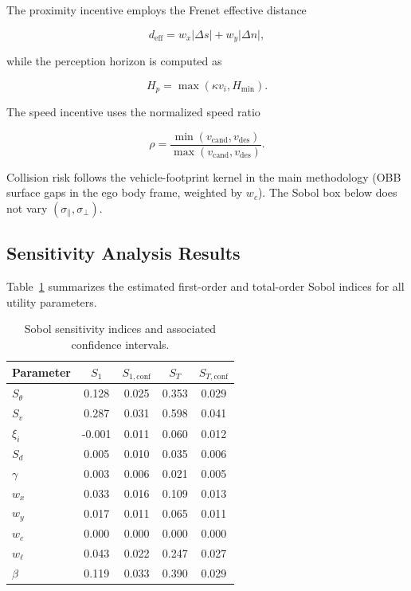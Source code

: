 \documentclass[conference]{IEEEtran}
\begin{document}
The proximity incentive employs the Frenet effective distance

\begin{equation}
d_{\mathrm{eff}}
=
w_x|\Delta s|
+
w_y|\Delta n|,
\end{equation}

while the perception horizon is computed as

\begin{equation}
H_p
=
\max(\kappa v_i,H_{\min}).
\end{equation}

The speed incentive uses the normalized speed ratio

\begin{equation}
\rho
=
\frac{\min(v_{\mathrm{cand}},v_{\mathrm{des}})}
{\max(v_{\mathrm{cand}},v_{\mathrm{des}})}.
\end{equation}

Collision risk follows the vehicle-footprint kernel in the main methodology (OBB surface gaps in the ego body frame, weighted by \(w_c\)). The Sobol box below does not vary \((\sigma_{\parallel},\sigma_{\perp})\).

\subsection{Sensitivity Analysis Results}

Table~\ref{tab:sobol_results} summarizes the estimated first-order and total-order Sobol indices for all utility parameters.

\begin{table}[h]
\centering
\caption{Sobol sensitivity indices and associated confidence intervals.}
\label{tab:sobol_results}
\begin{tabular}{lcccc}
\hline
Parameter & \(S_1\) & \(S_{1,\mathrm{conf}}\) & \(S_T\) & \(S_{T,\mathrm{conf}}\)\\
\hline
\(S_{\theta}\) & 0.128 & 0.025 & 0.353 & 0.029\\
\(S_v\)        & 0.287 & 0.031 & 0.598 & 0.041\\
\(\xi_i\)      & -0.001 & 0.011 & 0.060 & 0.012\\
\(S_d\)        & 0.005 & 0.010 & 0.035 & 0.006\\
\(\gamma\)     & 0.003 & 0.006 & 0.021 & 0.005\\
\(w_x\)        & 0.033 & 0.016 & 0.109 & 0.013\\
\(w_y\)        & 0.017 & 0.011 & 0.065 & 0.011\\
\(w_c\)        & 0.000 & 0.000 & 0.000 & 0.000\\
\(w_{\ell}\)   & 0.043 & 0.022 & 0.247 & 0.027\\
\(\beta\)      & 0.119 & 0.033 & 0.390 & 0.029\\
\hline
\end{tabular}
\end{table}
\end{document}

